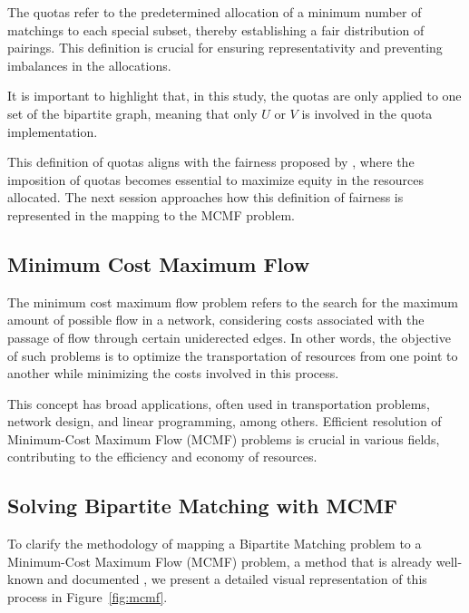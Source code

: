             The quotas refer to the predetermined allocation of a minimum number of matchings to each special subset, thereby establishing a fair distribution of pairings. This definition is crucial for ensuring representativity and preventing imbalances in the allocations.
            
            It is important to highlight that, in this study, the quotas are only applied to one set of the bipartite graph, meaning that only $U$ or $V$ is involved in the quota implementation.
            
            This definition of quotas aligns with the fairness proposed by \cite{sankar}, where the imposition of quotas becomes essential to maximize equity in the resources allocated. The next session approaches how this definition of fairness is represented in the mapping to the MCMF problem. 
            
            \subsection{Minimum Cost Maximum Flow}
            
            The minimum cost maximum flow problem refers to the search for the maximum amount of possible flow in a network, considering costs associated with the passage of flow through certain uniderected edges. In other words, the objective of such problems is to optimize the transportation of resources from one point to another while minimizing the costs involved in this process.
            
            This concept has broad applications, often used in transportation problems, network design, and linear programming, among others. Efficient resolution of Minimum-Cost Maximum Flow (MCMF) problems is crucial in various fields, contributing to the efficiency and economy of resources.
            
            \subsection{Solving Bipartite Matching with MCMF}\label{subsubsec:resolucao-fluxo-matching}
            
            To clarify the methodology of mapping a Bipartite Matching problem to a Minimum-Cost Maximum Flow (MCMF) problem, a method that is already well-known and documented \cite{ahuja1993network, edmonds1972theoretical, tarjan1997dynamic}, we present a detailed visual representation of this process in Figure~\ref{fig:mcmf}.
            
